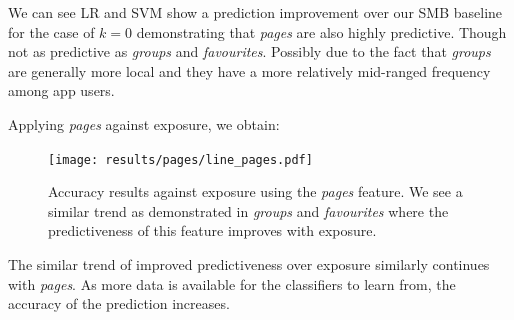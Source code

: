 We can see LR and SVM show a prediction improvement over our SMB baseline for the case of $k=0$ demonstrating that \emph{pages} are also highly predictive.
Though not as predictive as \emph{groups} and \emph{favourites}. Possibly due to the fact that \emph{groups} are generally more 
local and they have a more relatively mid-ranged frequency among app users.

\clearpage

Applying \emph{pages} against exposure, we obtain:

\begin{figure}[h]
	\begin{center}
		\texttt{[image: results/pages/line\_pages.pdf]}
		\caption{Accuracy results against exposure using the \emph{pages} feature. We see a similar trend as demonstrated in \emph{groups}
				 and \emph{favourites} where the predictiveness of this feature improves with exposure.}
	\end{center}
\end{figure}

The similar trend of improved predictiveness over exposure similarly continues with \emph{pages}. As more data is available for the 
classifiers to learn from, the accuracy of the prediction increases.

\clearpage

